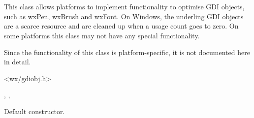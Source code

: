 \section{}\label{wxgdiobject}

This class allows platforms to implement functionality to optimise GDI objects, such
as wxPen, wxBrush and wxFont. On Windows, the underling GDI objects are a scarce resource
and are cleaned up when a usage count goes to zero. On some platforms this
class may not have any special functionality.

Since the functionality of this class is platform-specific, it is not documented here in detail.




<wx/gdiobj.h>


, , 


\label{wxgdiobjectconstr}


Default constructor.


